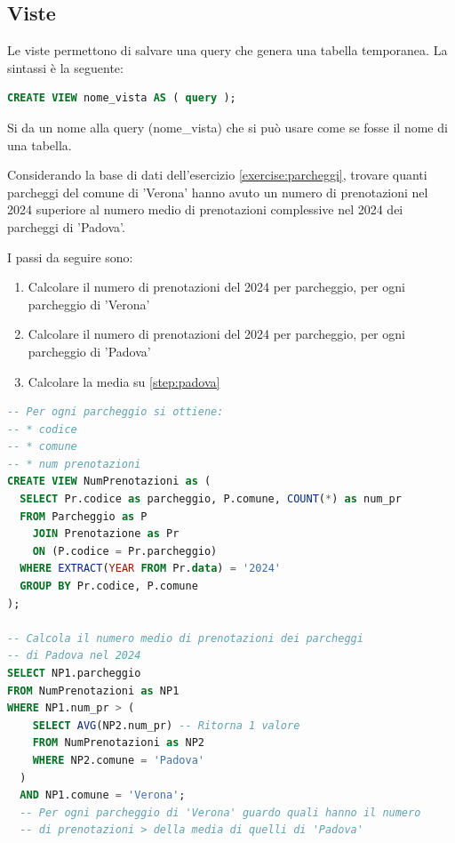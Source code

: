 \documentclass[a4paper,twoside]{article}
\begin{document}
\subsection{Viste}
Le viste permettono di salvare una query che genera una tabella temporanea.
La sintassi è la seguente:
\begin{lstlisting}[language=SQL, numbers=none]
CREATE VIEW nome_vista AS ( query );
\end{lstlisting}
Si da un nome alla query (nome\_vista) che si può usare come se fosse il nome di una
tabella.

\begin{example}
  Considerando la base di dati dell'esercizio \ref{exercise:parcheggi},
  trovare quanti parcheggi del comune di 'Verona' hanno avuto un numero di prenotazioni
  nel 2024 superiore al numero medio di prenotazioni complessive nel 2024 dei parcheggi
  di 'Padova'.

  I passi da seguire sono:
  \begin{enumerate}
    \item Calcolare il numero di prenotazioni del 2024 per parcheggio, per ogni
      parcheggio di 'Verona'

    \item \label{step:padova}
      Calcolare il numero di prenotazioni del 2024 per parcheggio, per ogni
      parcheggio di 'Padova'

    \item Calcolare la media su \ref{step:padova}
  \end{enumerate}

\begin{lstlisting}[language=SQL]
-- Per ogni parcheggio si ottiene:
-- * codice
-- * comune
-- * num prenotazioni
CREATE VIEW NumPrenotazioni as (
  SELECT Pr.codice as parcheggio, P.comune, COUNT(*) as num_pr
  FROM Parcheggio as P
    JOIN Prenotazione as Pr
    ON (P.codice = Pr.parcheggio)
  WHERE EXTRACT(YEAR FROM Pr.data) = '2024'
  GROUP BY Pr.codice, P.comune
);

-- Calcola il numero medio di prenotazioni dei parcheggi
-- di Padova nel 2024
SELECT NP1.parcheggio
FROM NumPrenotazioni as NP1
WHERE NP1.num_pr > (
    SELECT AVG(NP2.num_pr) -- Ritorna 1 valore
    FROM NumPrenotazioni as NP2
    WHERE NP2.comune = 'Padova'
  )
  AND NP1.comune = 'Verona';
  -- Per ogni parcheggio di 'Verona' guardo quali hanno il numero
  -- di prenotazioni > della media di quelli di 'Padova'
\end{lstlisting}
\end{example}
\end{document}
